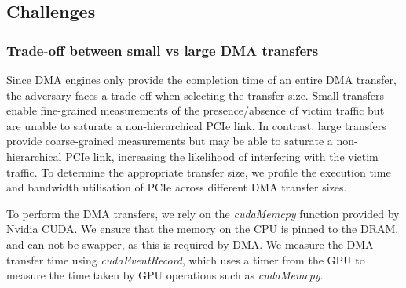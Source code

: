 \subsection{Challenges}
\label{subsec:interconnect-sc-dma-challenges}

\subsubsection{Trade-off between small vs large DMA transfers}
\label{subsubsec:interconnect-sc-dma-challenges-trade-off-small-v-large-tx}

Since DMA engines only provide the completion time of an entire DMA transfer, the adversary faces a trade-off when selecting the transfer size. 
Small transfers enable fine-grained measurements of the presence/absence of victim traffic but are unable to saturate a non-hierarchical PCIe link. 
In contrast, large transfers provide coarse-grained measurements but may be able to saturate a non-hierarchical PCIe link, increasing the likelihood of interfering with the victim traffic.
To determine the appropriate transfer size, we profile the execution time and bandwidth utilisation of PCIe across different DMA transfer sizes.

To perform the DMA transfers, we rely on the \textit{cudaMemcpy} function provided by Nvidia CUDA.
We ensure that the memory on the CPU is pinned to the DRAM, and can not be swapper, as this is required by DMA.
We measure the DMA transfer time using \textit{cudaEventRecord}, which uses a timer from the GPU to measure the time taken by GPU operations such as \textit{cudaMemcpy}.



